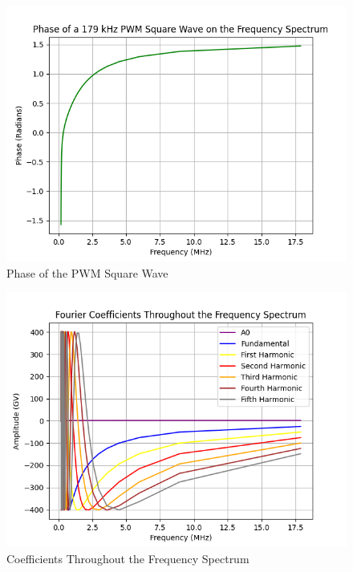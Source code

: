 \documentclass{article}
\begin{document}
\begin{figure}[h]
\includegraphics[scale=.70]{phase.png}
\caption{Phase of the PWM Square Wave}
\end{figure}

\begin{figure}[h]
\includegraphics[scale=.70]{coefficients.png}
\caption{Coefficients Throughout the Frequency Spectrum}
\end{figure}
\end{document}
